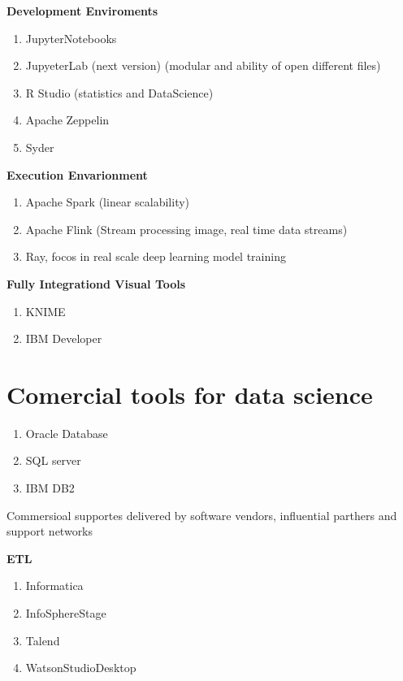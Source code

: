 \documentclass{article}
\begin{document}
\textbf{ Development Enviroments}
\begin{enumerate} 
    \item JupyterNotebooks
    \item JupyeterLab (next version) (modular and ability of open different files)   
    \item R Studio (statistics and DataScience)
    \item Apache Zeppelin
    \item Syder
\end{enumerate}


\textbf{ Execution Envarionment}

\begin{enumerate} 
    \item Apache Spark (linear scalability) 
    \item Apache Flink (Stream processing image, real time data streams)
    \item Ray, focos in real scale deep learning model training
\end{enumerate}

\textbf{ Fully Integrationd Visual Tools}
\begin{enumerate} 
    \item KNIME 
    \item IBM Developer
\end{enumerate}
 



\section{Comercial tools for data science}

\begin{enumerate} 
    \item Oracle Database
    \item SQL server
    \item IBM DB2 
\end{enumerate}

Commersioal supportes delivered by software vendors, influential parthers and support networks

\textbf{ ETL}
\begin{enumerate} 
    \item Informatica
    \item InfoSphereStage
    \item Talend
    \item WatsonStudioDesktop 
\end{enumerate}
\end{document}
